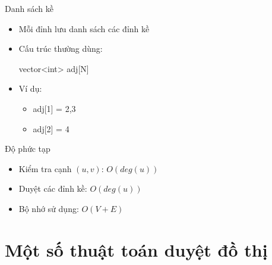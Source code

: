 \documentclass[aspectratio=169]{beamer}
\begin{document}
\begin{frame}{Danh sách kề}

\begin{itemize}

\item Mỗi đỉnh lưu danh sách các đỉnh kề

\item Cấu trúc thường dùng:

\begin{center}

vector<int> adj[N]

\end{center}

\item Ví dụ:

\begin{itemize}

\item adj[1] = {2,3}

\item adj[2] = {4}

\end{itemize}

\end{itemize}

\begin{block}{Độ phức tạp}

\begin{itemize}

\item Kiểm tra cạnh $(u,v)$: $O(deg(u))$

\item Duyệt các đỉnh kề: $O(deg(u))$

\item Bộ nhớ sử dụng: $O(V+E)$

\end{itemize}

\end{block}

\end{frame}
\section{Một số thuật toán duyệt đồ thị}
\end{document}
